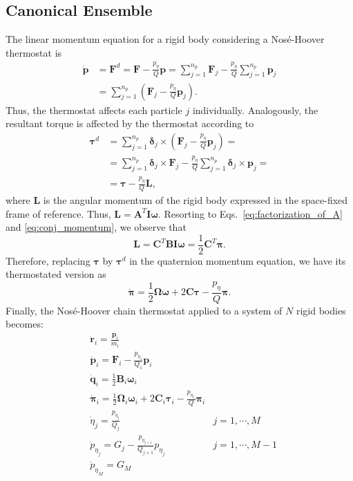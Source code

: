 \documentclass[aip,jcp,reprint,amsmath,amssymb]{revtex4-1}
\newcommand{\mt}[1]{\boldsymbol{\mathbf{#1}}}           %
\newcommand{\vt}[1]{\boldsymbol{\mathbf{#1}}}           %
\newcommand{\tr}[1]{#1^T}                               %
\begin{document}
\subsection{Canonical Ensemble}
\label{sec:canonical}
The linear momentum equation for a rigid body considering a Nos\'{e}-Hoover thermostat is
\begin{align*}
\dot{\vt p} &= \vt F^d = {\vt F} - \frac{p_{\eta}}{Q} {\vt p} = \sum_{j=1}^{n_p} {\vt F}_j - \frac{p_{\eta}}{Q} \sum_{j=1}^{n_p} {\vt p}_j \\
&= \sum_{j=1}^{n_p} \left( {\vt F}_j - \frac{p_{\eta}}{Q} {\vt p}_j \right).
\end{align*}
Thus, the thermostat affects each particle $j$ individually. Analogously, the resultant torque is affected by the thermostat according to
\begin{align*}
\vt \tau^d &= \sum_{j=1}^{n_p} {\vt \delta_j} \times \left( {\vt F_j}  - \frac{p_{\eta}}{Q} {\vt p}_j \right) = \\
&= \sum_{j=1}^{n_p} {\vt \delta_j} \times {\vt F_j} - \frac{p_{\eta}}{Q} \sum_{j=1}^{n_p} {\vt \delta_j} \times {\vt p}_j = \\
&= \vt \tau - \frac{p_{\eta}}{Q} \vt L,
\end{align*}
where $\vt L$ is the angular momentum of the rigid body expressed in the space-fixed frame of reference. Thus, $\vt L = \tr{\mt A}{\mt I}{\vt \omega}$. Resorting to Eqs.~\ref{eq:factorization_of_A} and \ref{eq:conj_momentum}, we observe that
\[
\vt L = \tr{\mt C}{\mt B}{\mt I}{\vt \omega} = \frac{1}{2} \tr{\mt C}{\vt \pi}.
\]
Therefore, replacing $\vt \tau$ by $\vt \tau^d$ in the quaternion momentum equation, we have its thermostated version as
\[
\dot{\vt \pi} = \frac{1}{2} \mt \Omega \vt \omega + 2 \mt C \vt \tau - \frac{p_{\eta}}{Q} \vt \pi.
\]
Finally, the Nos\'{e}-Hoover chain thermostat applied to a system of $N$ rigid bodies becomes:
\begin{subequations}
\label{eq:nhc_system}
\begin{align}
&\dot{\vt r}_i = \frac{{\vt p}_i}{m_i} \\ 
&\dot{\vt p}_i = {\vt F}_i - \frac{p_{\eta_1}}{Q_1} \vt p_i  \\
&\dot{\vt q}_i = \frac{1}{2} \mt B_i \vt \omega_i  \\
&\dot{\vt \pi}_i = \frac{1}{2} \mt \Omega_i \vt \omega_i + 2 \mt C_i \vt \tau_i - \frac{p_{\eta_1}}{Q} \vt \pi_i \\
&\dot{\eta}_j = \frac{p_{\eta_j}}{Q_j} & j = 1,\cdots,M \\
&{\dot p}_{\eta_j} = G_j - \frac{p_{\eta_{j+1}}}{Q_{j+1}} p_{\eta_j} & j = 1,\cdots,M-1 \label{eq:p_eta_j} \\
&{\dot p}_{\eta_M} = G_M
\end{align}
\end{subequations}
\end{document}

